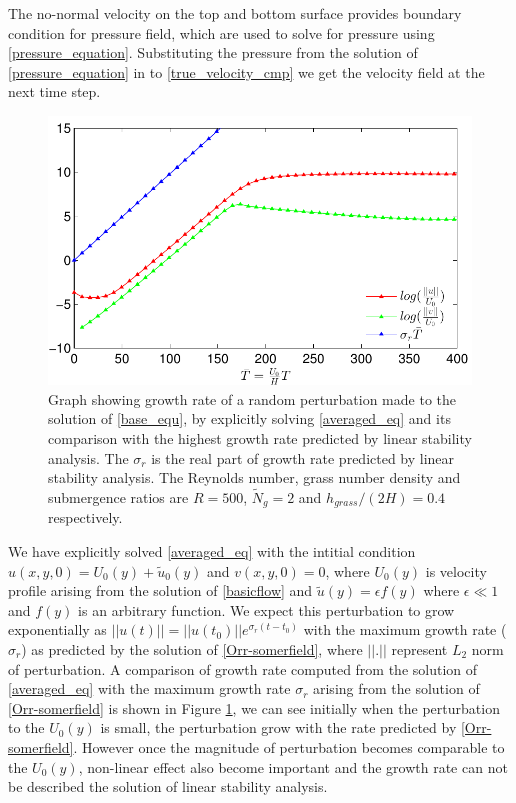 \documentclass[12pt]{report}   %
\newcommand{\Ndg}{\tilde{N}_g}
\begin{document}
The no-normal velocity on the top and bottom surface provides boundary condition for pressure field, which are used to solve for pressure using \eqref{pressure_equation}. Substituting the pressure from the solution of \eqref{pressure_equation} in to \eqref{true_velocity_cmp} we get the velocity field at the next time step. 
\begin{figure}
\centerline{\includegraphics{LinearStabilityVsCFD1} }
\caption{Graph showing growth rate of a random perturbation made to the solution of \eqref{base_equ}, by explicitly solving \eqref{averaged_eq} and its comparison with the highest growth rate predicted by linear stability analysis. The $\sigma_r$ is the real part of growth rate predicted by linear stability analysis. The  Reynolds number, grass number density and submergence ratios are $R=500$, $\Ndg=2$ and $h_{grass}/(2H) = 0.4$ respectively.}
\label{CFD_vs_LinearStabilityGrowthRate}
\end{figure}

We have explicitly solved \eqref{averaged_eq} with the intitial condition $u(x,y,0) = U_{0}(y)+\tilde{u}_0(y)$ and $v(x,y,0)=0$, where $U_{0}(y)$ is velocity profile arising from the solution of \eqref{basicflow} and $\tilde{u}(y) = \epsilon f(y)$ where $\epsilon \ll 1$ and $f(y)$ is an arbitrary function. We expect this perturbation to grow exponentially as $||u(t)|| = ||u(t_0)|| e^{\sigma_r (t-t_0)}$ with the maximum growth rate ($\sigma_r$) as predicted by the solution of \eqref{Orr-somerfield}, where $||.||$ represent $L_2$ norm of perturbation. A comparison of growth rate computed from the solution of \eqref{averaged_eq} with the
maximum growth rate $\sigma_r$ arising from the solution of \eqref{Orr-somerfield} is shown in Figure \ref{CFD_vs_LinearStabilityGrowthRate}, we can see initially when the perturbation to the $U_0(y)$ is small, the perturbation grow with the rate predicted by \eqref{Orr-somerfield}. However once the magnitude of perturbation becomes comparable to the $U_0(y)$, non-linear effect also become important and the growth rate can not be described the solution of linear stability analysis. 
\end{document}
